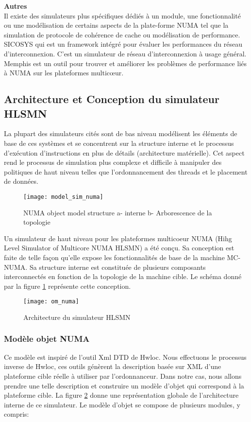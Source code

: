 \textbf{Autres}\\
Il existe des simulateurs plus spécifiques dédiés à un module, une fonctionnalité ou une modélisation de certains aspects de la plate-forme NUMA tel que la simulation de protocole de cohérence de cache ou modélisation de performance. 
SICOSYS \cite{SIC21}
qui est un framework intégré pour évaluer les performances du réseau d'interconnexion. C'est un simulateur de réseau d'interconnexion à usage général. Memphis \cite{Mem22}
est un outil pour trouver et améliorer les problèmes de performance liés à NUMA sur les plateformes multicœur.
  
%
\subsection{Architecture et Conception du simulateur HLSMN}
La plupart des simulateurs cités sont de bas niveau modélisent les éléments de base de ces systèmes et se concentrent sur la structure interne et le processus d'exécution d'instructions en plus de détails (architecture matérielle). 
Cet aspect rend le processus de simulation plus complexe et difficile à manipuler des politiques de haut niveau telles que l'ordonnancement des threads et le placement de données. 
%
\begin{figure}[h]
\texttt{[image: model\_sim\_numa]}
\centering
\caption{NUMA object model structure a- interne b- Arborescence de la topologie}
\label{fig:NUMAMOSIAT}
\end{figure}
%
Un simulateur de haut niveau pour les plateformes multicoeur NUMA (Hihg Level Simulator of Multicore NUMA HLSMN) a été conçu. Sa conception est faite de telle façon qu'elle expose les fonctionnalités de base de la machine MC-NUMA. Sa structure interne est constituée de plusieurs composants interconnectés en fonction de la topologie de la machine cible. Le schéma donné par la figure \ref{fig:NUMAMOSIAT} représente cette conception. 
\begin{figure}[h]
    \centering
    \texttt{[image: om\_numa]}
    \caption{Architecture du simulateur HLSMN}
    \label{fig:archHLSMN}
\end{figure}
\subsubsection{Modèle objet NUMA}
Ce modèle est inspiré de l'outil Xml DTD de Hwloc. Nous effectuons le processus inverse de Hwloc, ces outils génèrent la description basée sur XML d'une plateforme cible réelle à utiliser par l'ordonnanceur. Dans notre cas, nous allons prendre une telle description et construire un modèle d'objet qui correspond à la plateforme cible. La figure \ref{fig:archHLSMN} donne une représentation globale de l'architecture interne de ce simulateur.  Le modèle d'objet se compose de plusieurs modules, y compris:

